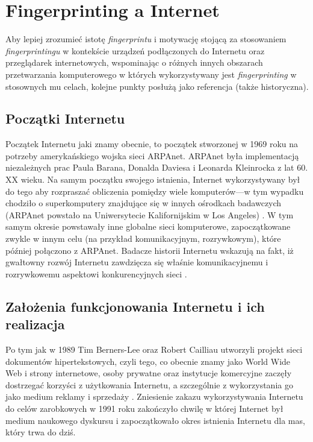 \section{Fingerprinting a Internet} %
Aby lepiej zrozumieć istotę \emph{fingerprintu} i motywację stojącą za
stosowaniem \emph{fingerprintingu} w kontekście urządzeń podłączonych do
Internetu oraz przeglądarek internetowych, wspominając o różnych innych
obszarach przetwarzania komputerowego w których wykorzystywany jest
\emph{fingerprinting} w stosownych mu celach, kolejne punkty posłużą jako
referencja (także historyczna).

\subsection{Początki Internetu}
Początek Internetu jaki znamy obecnie, to początek stworzonej w 1969 roku na
potrzeby amerykańskiego wojska sieci ARPAnet. ARPAnet była implementacją
niezależnych prac Paula Barana, Donalda Daviesa i Leonarda Kleinrocka z lat 60.
XX wieku. Na samym początku swojego istnienia, Internet wykorzystywany był do
tego aby rozpraszać obliczenia pomiędzy wiele komputerów---w tym wypadku
chodziło o superkomputery znajdujące się w innych ośrodkach badawczych (ARPAnet
powstało na Uniwersytecie Kalifornijskim w Los Angeles) \cite{press2015very}. W
tym samym okresie powstawały inne globalne sieci komputerowe, zapoczątkowane
zwykle w innym celu (na przykład komunikacyjnym, rozrywkowym), które później
połączono z ARPAnet. Badacze historii Internetu wskazują na fakt, iż gwałtowny
rozwój Internetu zawdzięcza się właśnie komunikacyjnemu i rozrywkowemu aspektowi
konkurencyjnych sieci \cite{maigret2012socjologia}.

\subsection{Założenia funkcjonowania Internetu i ich realizacja}
Po tym jak w 1989 Tim Berners-Lee oraz Robert Cailliau utworzyli projekt sieci
dokumentów hipertekstowych, czyli tego, co obecnie znamy jako World Wide Web i
strony internetowe, osoby prywatne oraz instytucje komercyjne zaczęły dostrzegać
korzyści z użytkowania Internetu, a szczególnie z wykorzystania go jako medium
reklamy i sprzedaży \cite{press2015very}. Zniesienie zakazu wykorzystywania
Internetu do celów zarobkowych w 1991 roku zakończyło chwilę w której Internet
był medium naukowego dyskursu i zapoczątkowało okres istnienia Internetu dla
mas, który trwa do dziś.


